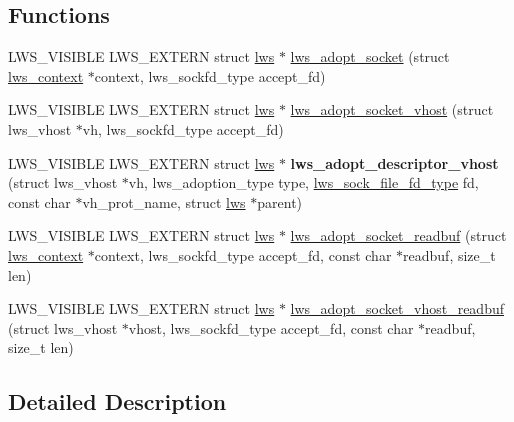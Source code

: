 \subsection*{Functions}
\begin{DoxyCompactItemize}
\item 
L\+W\+S\+\_\+\+V\+I\+S\+I\+B\+LE L\+W\+S\+\_\+\+E\+X\+T\+E\+RN struct \hyperlink{structlws}{lws} $\ast$ \hyperlink{group__sock-adopt_ga2003db73fc10b05b8e17a9ee715727a9}{lws\+\_\+adopt\+\_\+socket} (struct \hyperlink{structlws__context}{lws\+\_\+context} $\ast$context, lws\+\_\+sockfd\+\_\+type accept\+\_\+fd)
\item 
L\+W\+S\+\_\+\+V\+I\+S\+I\+B\+LE L\+W\+S\+\_\+\+E\+X\+T\+E\+RN struct \hyperlink{structlws}{lws} $\ast$ \hyperlink{group__sock-adopt_gab95398ca701a0a5189381fb472a890cc}{lws\+\_\+adopt\+\_\+socket\+\_\+vhost} (struct lws\+\_\+vhost $\ast$vh, lws\+\_\+sockfd\+\_\+type accept\+\_\+fd)
\item 
\mbox{\label{group__sock-adopt_ga08b9cf35b4d5fb4616d1f9db2ca589d0}} 
L\+W\+S\+\_\+\+V\+I\+S\+I\+B\+LE L\+W\+S\+\_\+\+E\+X\+T\+E\+RN struct \hyperlink{structlws}{lws} $\ast$ {\bfseries lws\+\_\+adopt\+\_\+descriptor\+\_\+vhost} (struct lws\+\_\+vhost $\ast$vh, lws\+\_\+adoption\+\_\+type type, \hyperlink{unionlws__sock__file__fd__type}{lws\+\_\+sock\+\_\+file\+\_\+fd\+\_\+type} fd, const char $\ast$vh\+\_\+prot\+\_\+name, struct \hyperlink{structlws}{lws} $\ast$parent)
\item 
L\+W\+S\+\_\+\+V\+I\+S\+I\+B\+LE L\+W\+S\+\_\+\+E\+X\+T\+E\+RN struct \hyperlink{structlws}{lws} $\ast$ \hyperlink{group__sock-adopt_ga3c98a2ea8006836738b9260257bce69d}{lws\+\_\+adopt\+\_\+socket\+\_\+readbuf} (struct \hyperlink{structlws__context}{lws\+\_\+context} $\ast$context, lws\+\_\+sockfd\+\_\+type accept\+\_\+fd, const char $\ast$readbuf, size\+\_\+t len)
\item 
L\+W\+S\+\_\+\+V\+I\+S\+I\+B\+LE L\+W\+S\+\_\+\+E\+X\+T\+E\+RN struct \hyperlink{structlws}{lws} $\ast$ \hyperlink{group__sock-adopt_ga1ad01edd42dab4deca1b1c25694e0f3d}{lws\+\_\+adopt\+\_\+socket\+\_\+vhost\+\_\+readbuf} (struct lws\+\_\+vhost $\ast$vhost, lws\+\_\+sockfd\+\_\+type accept\+\_\+fd, const char $\ast$readbuf, size\+\_\+t len)
\end{DoxyCompactItemize}


\subsection{Detailed Description}

